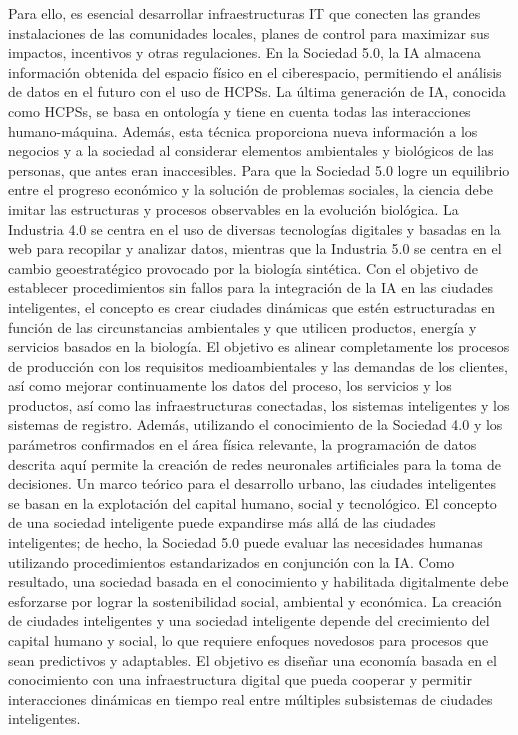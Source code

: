 \documentclass[crop=false]{standalone}
\begin{document}
{Para ello, es esencial desarrollar infraestructuras IT que conecten las grandes instalaciones de las comunidades locales, planes de control para maximizar sus impactos, incentivos y otras regulaciones.
En la Sociedad 5.0, la IA almacena información obtenida del espacio físico en el ciberespacio, permitiendo el análisis de datos en el futuro con el uso de HCPSs. La última generación de IA, conocida como HCPSs, se basa en ontología y tiene en cuenta todas las interacciones humano-máquina. Además, esta técnica proporciona nueva información a los negocios y a la sociedad al considerar elementos ambientales y biológicos de las personas, que antes eran inaccesibles. Para que la Sociedad 5.0 logre un equilibrio entre el progreso económico y la solución de problemas sociales, la ciencia debe imitar las estructuras y procesos observables en la evolución biológica.
La Industria 4.0 se centra en el uso de diversas tecnologías digitales y basadas en la web para recopilar y analizar datos, mientras que la Industria 5.0 se centra en el cambio geoestratégico provocado por la biología sintética.
Con el objetivo de establecer procedimientos sin fallos para la integración de la IA en las ciudades inteligentes, el concepto es crear ciudades dinámicas que estén estructuradas en función de las circunstancias ambientales y que utilicen productos, energía y servicios basados en la biología. El objetivo es alinear completamente los procesos de producción con los requisitos medioambientales y las demandas de los clientes, así como mejorar continuamente los datos del proceso, los servicios y los productos, así como las infraestructuras conectadas, los sistemas inteligentes y los sistemas de registro. Además, utilizando el conocimiento de la Sociedad 4.0 y los parámetros confirmados en el área física relevante, la programación de datos descrita aquí permite la creación de redes neuronales artificiales para la toma de decisiones.
Un marco teórico para el desarrollo urbano, las ciudades inteligentes se basan en la explotación del capital humano, social y tecnológico. El concepto de una sociedad inteligente puede expandirse más allá de las ciudades inteligentes; de hecho, la Sociedad 5.0 puede evaluar las necesidades humanas utilizando procedimientos estandarizados en conjunción con la IA. Como resultado, una sociedad basada en el conocimiento y habilitada digitalmente debe esforzarse por lograr la sostenibilidad social, ambiental y económica.
La creación de ciudades inteligentes y una sociedad inteligente depende del crecimiento del capital humano y social, lo que requiere enfoques novedosos para procesos que sean predictivos y adaptables. El objetivo es diseñar una economía basada en el conocimiento con una infraestructura digital que pueda cooperar y permitir interacciones dinámicas en tiempo real entre múltiples subsistemas de ciudades inteligentes.
}
\end{document}
